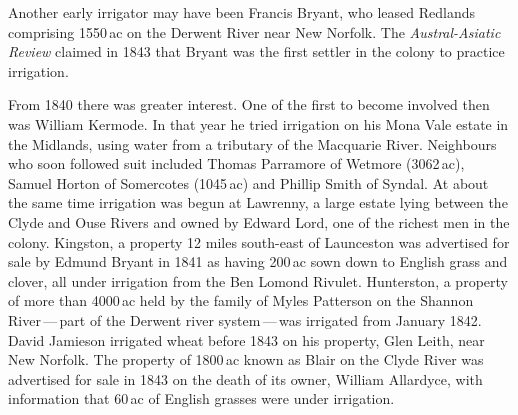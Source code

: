 Another early irrigator may have been Francis Bryant, who leased Redlands comprising 1550\,ac on the
Derwent River near New Norfolk.  The \textsl{Austral-Asiatic Review}
claimed in 1843 that Bryant was the first settler in the colony to
practice irrigation.

From 1840 there was greater interest.  One of the first to become
involved then was William Kermode.  In that year he
tried irrigation on his Mona Vale estate in the
Midlands, using water from a tributary of the Macquarie
River. Neighbours who soon followed suit
included Thomas Parramore of
Wetmore (3062\,ac), Samuel Horton of
Somercotes (1045\,ac) and Phillip Smith of Syndal.
At about the same time irrigation was begun at Lawrenny, a large
estate lying between the Clyde and Ouse Rivers and
owned by Edward Lord, one of the richest men in the
colony.  Kingston, a property 12 miles south-east of
Launceston was advertised for sale by Edmund Bryant
in 1841 as having 200\,ac sown down to English grass and clover, all
under irrigation from the Ben Lomond Rivulet.
Hunterston, a property of more than 4000\,ac held by the family of
Myles Patterson on the Shannon
River\,---\,part of the Derwent river
system\,---\,was irrigated from January 1842.  David
Jamieson  irrigated wheat before 1843 on his
property, Glen Leith, near New Norfolk.  The property of 1800\,ac
known as Blair on the Clyde River was advertised for sale in 1843 on
the death of its owner, William Allardyce, with
information that 60\,ac of English grasses were under
irrigation.

